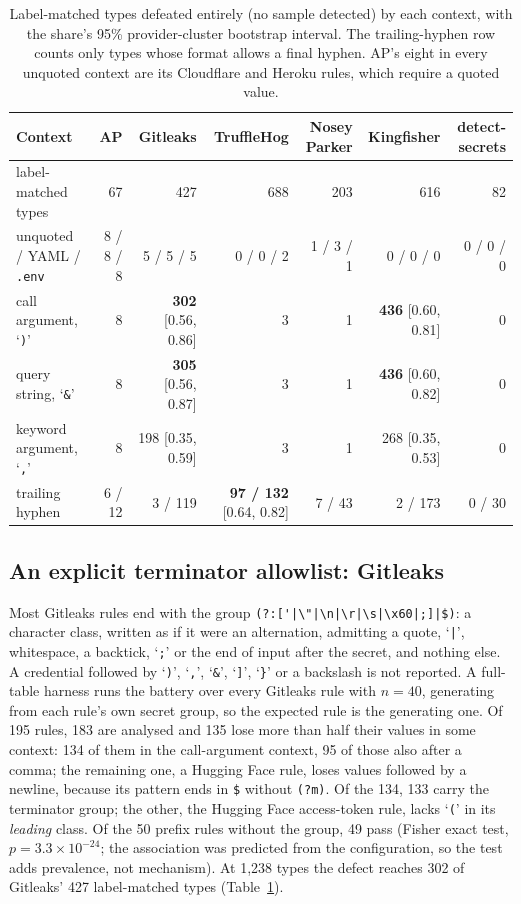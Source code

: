 \documentclass[10pt,journal,compsoc]{IEEEtran}
\begin{document}
\begin{table}[t]
\centering
\caption{Label-matched types defeated entirely (no sample detected) by each context, with the share's 95\% provider-cluster bootstrap interval. The trailing-hyphen row counts only types whose format allows a final hyphen. AP's eight in every unquoted context are its Cloudflare and Heroku rules, which require a quoted value.}
\label{tab:prevalence}
\footnotesize
\setlength{\tabcolsep}{4pt}
\begin{tabular}{@{}lrrrrrr@{}}
\toprule
Context & AP & Gitleaks & TruffleHog & Nosey Parker & Kingfisher & detect-secrets \\
\midrule
label-matched types & 67 & 427 & 688 & 203 & 616 & 82 \\
\midrule
unquoted / YAML / \texttt{.env} & 8 / 8 / 8 & 5 / 5 / 5 & 0 / 0 / 2 & 1 / 3 / 1 & 0 / 0 / 0 & 0 / 0 / 0 \\
call argument, `\texttt{)}' & 8 & \textbf{302} [0.56, 0.86] & 3 & 1 & \textbf{436} [0.60, 0.81] & 0 \\
query string, `\texttt{\&}' & 8 & \textbf{305} [0.56, 0.87] & 3 & 1 & \textbf{436} [0.60, 0.82] & 0 \\
keyword argument, `\texttt{,}' & 8 & 198 [0.35, 0.59] & 3 & 1 & 268 [0.35, 0.53] & 0 \\
\midrule
trailing hyphen & 6 / 12 & 3 / 119 & \textbf{97 / 132} [0.64, 0.82] & 7 / 43 & 2 / 173 & 0 / 30 \\
\bottomrule
\end{tabular}
\end{table}

\subsection{An explicit terminator allowlist: Gitleaks}
\label{sec:rq3-gitleaks}

Most Gitleaks rules end with the group \lstinline!(?:['|\"|\n|\r|\s|\x60|;]|$)!: a character class, written as if it were an alternation, admitting a quote, `\texttt{|}', whitespace, a backtick, `\texttt{;}' or the end of input after the secret, and nothing else. A credential followed by `\texttt{)}', `\texttt{,}', `\texttt{\&}', `\texttt{]}', `\texttt{\}}' or a backslash is not reported. A full-table harness runs the battery over every Gitleaks rule with $n=40$, generating from each rule's own secret group, so the expected rule is the generating one. Of 195 rules, 183 are analysed and 135 lose more than half their values in some context: 134 of them in the call-argument context, 95 of those also after a comma; the remaining one, a Hugging Face rule, loses values followed by a newline, because its pattern ends in \verb|$| without \texttt{(?m)}. Of the 134, 133 carry the terminator group; the other, the Hugging Face access-token rule, lacks `\texttt{(}' in its \emph{leading} class. Of the 50 prefix rules without the group, 49 pass (Fisher exact test, $p=3.3\times10^{-24}$; the association was predicted from the configuration, so the test adds prevalence, not mechanism). At 1{,}238 types the defect reaches 302 of Gitleaks' 427 label-matched types (Table~\ref{tab:prevalence}).
\end{document}
